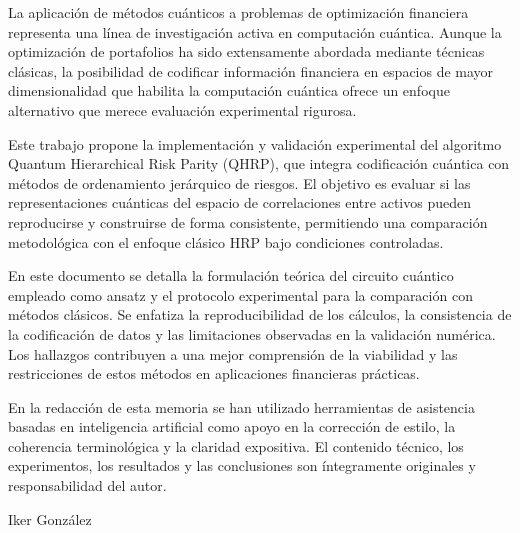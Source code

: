 La aplicación de métodos cuánticos a problemas de optimización financiera representa una línea de investigación activa en computación cuántica. Aunque la optimización de portafolios ha sido extensamente abordada mediante técnicas clásicas, la posibilidad de codificar información financiera en espacios de mayor dimensionalidad que habilita la computación cuántica ofrece un enfoque alternativo que merece evaluación experimental rigurosa.

Este trabajo propone la implementación y validación experimental del algoritmo Quantum Hierarchical Risk Parity (QHRP), que integra codificación cuántica con métodos de ordenamiento jerárquico de riesgos. El objetivo es evaluar si las representaciones cuánticas del espacio de correlaciones entre activos pueden reproducirse y construirse de forma consistente, permitiendo una comparación metodológica con el enfoque clásico HRP bajo condiciones controladas.

En este documento se detalla la formulación teórica del circuito cuántico empleado como ansatz y el protocolo experimental para la comparación con métodos clásicos. Se enfatiza la reproducibilidad de los cálculos, la consistencia de la codificación de datos y las limitaciones observadas en la validación numérica. Los hallazgos contribuyen a una mejor comprensión de la viabilidad y las restricciones de estos métodos en aplicaciones financieras prácticas.

En la redacción de esta memoria se han utilizado herramientas de asistencia basadas en inteligencia artificial como apoyo en la corrección de estilo, la coherencia terminológica y la claridad expositiva. El contenido técnico, los experimentos, los resultados y las conclusiones son íntegramente originales y responsabilidad del autor.

\hfill \begin{flushright}Iker González\end{flushright}\hfill
